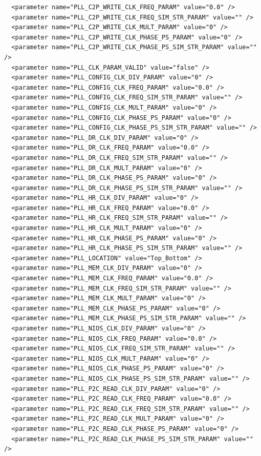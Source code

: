 \documentclass[conference]{IEEEtran}
\begin{document}
\begin{lstlisting}
  <parameter name="PLL_C2P_WRITE_CLK_FREQ_PARAM" value="0.0" />
  <parameter name="PLL_C2P_WRITE_CLK_FREQ_SIM_STR_PARAM" value="" />
  <parameter name="PLL_C2P_WRITE_CLK_MULT_PARAM" value="0" />
  <parameter name="PLL_C2P_WRITE_CLK_PHASE_PS_PARAM" value="0" />
  <parameter name="PLL_C2P_WRITE_CLK_PHASE_PS_SIM_STR_PARAM" value="" />
  <parameter name="PLL_CLK_PARAM_VALID" value="false" />
  <parameter name="PLL_CONFIG_CLK_DIV_PARAM" value="0" />
  <parameter name="PLL_CONFIG_CLK_FREQ_PARAM" value="0.0" />
  <parameter name="PLL_CONFIG_CLK_FREQ_SIM_STR_PARAM" value="" />
  <parameter name="PLL_CONFIG_CLK_MULT_PARAM" value="0" />
  <parameter name="PLL_CONFIG_CLK_PHASE_PS_PARAM" value="0" />
  <parameter name="PLL_CONFIG_CLK_PHASE_PS_SIM_STR_PARAM" value="" />
  <parameter name="PLL_DR_CLK_DIV_PARAM" value="0" />
  <parameter name="PLL_DR_CLK_FREQ_PARAM" value="0.0" />
  <parameter name="PLL_DR_CLK_FREQ_SIM_STR_PARAM" value="" />
  <parameter name="PLL_DR_CLK_MULT_PARAM" value="0" />
  <parameter name="PLL_DR_CLK_PHASE_PS_PARAM" value="0" />
  <parameter name="PLL_DR_CLK_PHASE_PS_SIM_STR_PARAM" value="" />
  <parameter name="PLL_HR_CLK_DIV_PARAM" value="0" />
  <parameter name="PLL_HR_CLK_FREQ_PARAM" value="0.0" />
  <parameter name="PLL_HR_CLK_FREQ_SIM_STR_PARAM" value="" />
  <parameter name="PLL_HR_CLK_MULT_PARAM" value="0" />
  <parameter name="PLL_HR_CLK_PHASE_PS_PARAM" value="0" />
  <parameter name="PLL_HR_CLK_PHASE_PS_SIM_STR_PARAM" value="" />
  <parameter name="PLL_LOCATION" value="Top_Bottom" />
  <parameter name="PLL_MEM_CLK_DIV_PARAM" value="0" />
  <parameter name="PLL_MEM_CLK_FREQ_PARAM" value="0.0" />
  <parameter name="PLL_MEM_CLK_FREQ_SIM_STR_PARAM" value="" />
  <parameter name="PLL_MEM_CLK_MULT_PARAM" value="0" />
  <parameter name="PLL_MEM_CLK_PHASE_PS_PARAM" value="0" />
  <parameter name="PLL_MEM_CLK_PHASE_PS_SIM_STR_PARAM" value="" />
  <parameter name="PLL_NIOS_CLK_DIV_PARAM" value="0" />
  <parameter name="PLL_NIOS_CLK_FREQ_PARAM" value="0.0" />
  <parameter name="PLL_NIOS_CLK_FREQ_SIM_STR_PARAM" value="" />
  <parameter name="PLL_NIOS_CLK_MULT_PARAM" value="0" />
  <parameter name="PLL_NIOS_CLK_PHASE_PS_PARAM" value="0" />
  <parameter name="PLL_NIOS_CLK_PHASE_PS_SIM_STR_PARAM" value="" />
  <parameter name="PLL_P2C_READ_CLK_DIV_PARAM" value="0" />
  <parameter name="PLL_P2C_READ_CLK_FREQ_PARAM" value="0.0" />
  <parameter name="PLL_P2C_READ_CLK_FREQ_SIM_STR_PARAM" value="" />
  <parameter name="PLL_P2C_READ_CLK_MULT_PARAM" value="0" />
  <parameter name="PLL_P2C_READ_CLK_PHASE_PS_PARAM" value="0" />
  <parameter name="PLL_P2C_READ_CLK_PHASE_PS_SIM_STR_PARAM" value="" />

\end{lstlisting}
\end{document}
